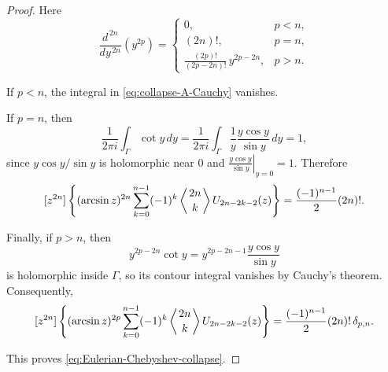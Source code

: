 \documentclass[10pt,a4paper]{amsart}
\begin{document}
\begin{proof}
Here
\[
\frac{d^{\,2n}}{dy^{\,2n}}
\left(y^{2p}\right)
=
\begin{cases}
0,
& p<n,
\\[1ex]
(2n)!,
& p=n,
\\[1ex]
\displaystyle
\frac{(2p)!}{(2p-2n)!}\,
y^{2p-2n},
& p>n.
\end{cases}
\]

If $p<n$, the integral in
\cref{eq:collapse-A-Cauchy} vanishes.

If $p=n$, then
\[
\frac{1}{2\pi i}
\int_{\Gamma}\cot y\,dy
=
\frac{1}{2\pi i}
\int_{\Gamma}
\frac{1}{y}
\frac{y\cos y}{\sin y}\,dy
=1,
\]
since $y\cos y/\sin y$ is holomorphic near $0$ and \(\displaystyle\left.\frac{y\cos y}{\sin y}\right|_{y=0}=1.\)
Therefore
\[
[z^{2n}]\left\{
(\arcsin z)^{2n}
\sum_{k=0}^{n-1}
(-1)^k
\left\langle {2n\atop k}\right\rangle
U_{2n-2k-2}(z)\right\}
=
\frac{(-1)^{n-1}}{2}(2n)!.
\]

Finally, if $p>n$, then
\[
y^{2p-2n}\cot y
=
y^{2p-2n-1}
\frac{y\cos y}{\sin y}
\]
is holomorphic inside $\Gamma$, so its contour integral vanishes
by Cauchy's theorem. Consequently,
\[
[z^{2n}]\left\{
(\arcsin z)^{2p}
\sum_{k=0}^{n-1}
(-1)^k
\left\langle {2n\atop k}\right\rangle
U_{2n-2k-2}(z)\right\}
=
\frac{(-1)^{n-1}}{2}(2n)!\,\delta_{p,n}.
\]

This proves \cref{eq:Eulerian-Chebyshev-collapse}.
\end{proof}
\end{document}
